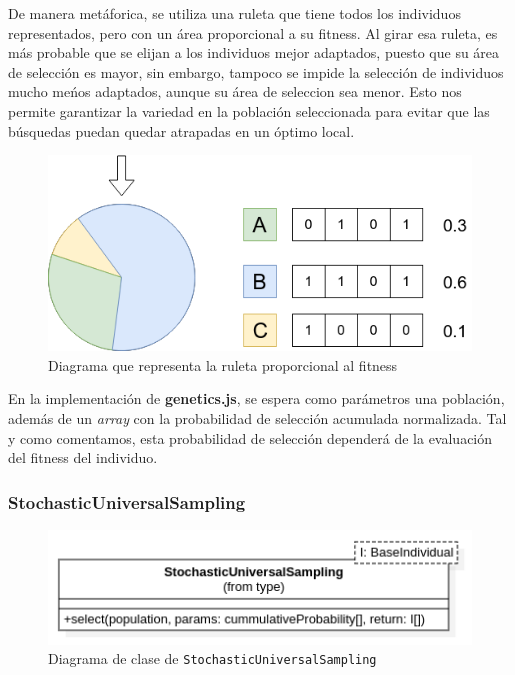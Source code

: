 De manera metáforica, se utiliza una ruleta que tiene todos los individuos representados, pero con un área proporcional a su fitness. Al girar esa ruleta, es más probable que se elijan a los individuos mejor adaptados, puesto que su área de selección es mayor, sin embargo, tampoco se impide la selección de individuos mucho meńos adaptados, aunque su área de seleccion sea menor. Esto nos permite garantizar la variedad en la población seleccionada para evitar que las búsquedas puedan quedar atrapadas en un óptimo local. \\

\begin{figure}[ht]
    \centering
    \includegraphics[scale=0.5]{mem/images/cap-4/4.2.5(Selection)/RouletteWheel-1.png}
    \caption{Diagrama que representa la ruleta proporcional al fitness}
    \label{fig:roulette-wheel-example}
\end{figure}

En la implementación de \textbf{genetics.js}, se espera como parámetros una población, además de un \textit{array} con la probabilidad de selección acumulada normalizada. Tal y como comentamos, esta probabilidad de selección dependerá de la evaluación del fitness del individuo.

\subsubsection{StochasticUniversalSampling}

\begin{figure}[ht]
    \centering
    \includegraphics[scale=0.6]{mem/images/cap-4/4.2.5(Selection)/SUS.png}
    \caption{Diagrama de clase de \texttt{StochasticUniversalSampling}}
    \label{fig:generator-uml}
\end{figure}



